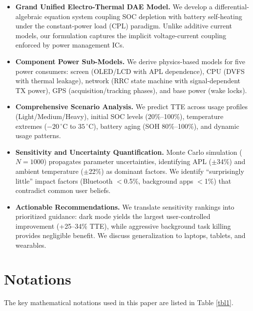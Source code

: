 \documentclass{mcmthesis}
\begin{document}
\begin{itemize}[noitemsep]
  \item \textbf{Grand Unified Electro-Thermal DAE Model.} We develop a differential-algebraic equation system coupling SOC depletion with battery self-heating under the constant-power load (CPL) paradigm. Unlike additive current models, our formulation captures the implicit voltage-current coupling enforced by power management ICs.

  \item \textbf{Component Power Sub-Models.} We derive physics-based models for five power consumers: screen (OLED/LCD with APL dependence), CPU (DVFS with thermal leakage), network (RRC state machine with signal-dependent TX power), GPS (acquisition/tracking phases), and base power (wake locks).

  \item \textbf{Comprehensive Scenario Analysis.} We predict TTE across usage profiles (Light/Medium/Heavy), initial SOC levels (20\%--100\%), temperature extremes ($-20\,^{\circ}$C to $35\,^{\circ}$C), battery aging (SOH 80\%--100\%), and dynamic usage patterns.

  \item \textbf{Sensitivity and Uncertainty Quantification.} Monte Carlo simulation ($N=1000$) propagates parameter uncertainties, identifying APL ($\pm$34\%) and ambient temperature ($\pm$22\%) as dominant factors. We identify ``surprisingly little'' impact factors (Bluetooth $<$0.5\%, background apps $<$1\%) that contradict common user beliefs.

  \item \textbf{Actionable Recommendations.} We translate sensitivity rankings into prioritized guidance: dark mode yields the largest user-controlled improvement (+25--34\% TTE), while aggressive background task killing provides negligible benefit. We discuss generalization to laptops, tablets, and wearables.
\end{itemize}

\section{Notations}

The key mathematical notations used in this paper are listed in Table \ref{tbl1}.
\end{document}
